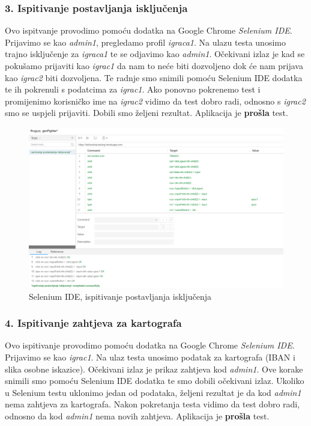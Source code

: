 			\subsubsection{3. Ispitivanje postavljanja isključenja}
			
				{Ovo ispitvanje provodimo pomoću dodatka na Google Chrome \emph{Selenium IDE}. Prijavimo se kao \emph{admin1}, pregledamo profil \emph{igraca1}. Na ulazu testa unosimo trajno isključenje za \emph{igraca1} te se odjavimo kao \emph{admin1}. Očekivani izlaz je kad se pokušamo prijaviti kao \emph{igrac1} da nam to neće biti dozvoljeno dok će nam prijava kao \emph{igrac2} biti dozvoljena. Te radnje smo snimili pomoću Selenium IDE dodatka te ih pokrenuli s podatcima za \emph{igrac1}. Ako ponovno pokrenemo test i promijenimo korisničko ime na \emph{igrac2} vidimo da test dobro radi, odnosno s \emph{igrac2} smo se uspjeli prijaviti. Dobili smo željeni rezultat. Aplikacija je \textbf{prošla} test.}
					
					\begin{figure}[H]
						\includegraphics[width=\textwidth]{slike/SeleniumIDE_test1} 
						\centering
						\caption{Selenium IDE, ispitivanje postavljanja isključenja}
						\label{}
					\end{figure}
				\eject
			\subsubsection{4. Ispitivanje zahtjeva za kartografa}
			
				{Ovo ispitivanje provodimo pomoću dodatka na Google Chrome \emph{Selenium IDE}. Prijavimo se kao \emph{igrac1}. Na ulaz testa unosimo podatak za kartografa (IBAN i slika osobne iskazice). Očekivani izlaz je prikaz zahtjeva kod \emph{admin1}. Ove korake snimili smo pomoću Selenium IDE dodatka te smo dobili očekivani izlaz. Ukoliko u Selenium testu uklonimo jedan od podataka, željeni rezultat je da kod \emph{admin1} nema zahtjeva za kartografa. Nakon pokretanja testa vidimo da test dobro radi, odnosno da kod \emph{admin1} nema novih zahtjeva. Aplikacija je \textbf{prošla} test. }
					
